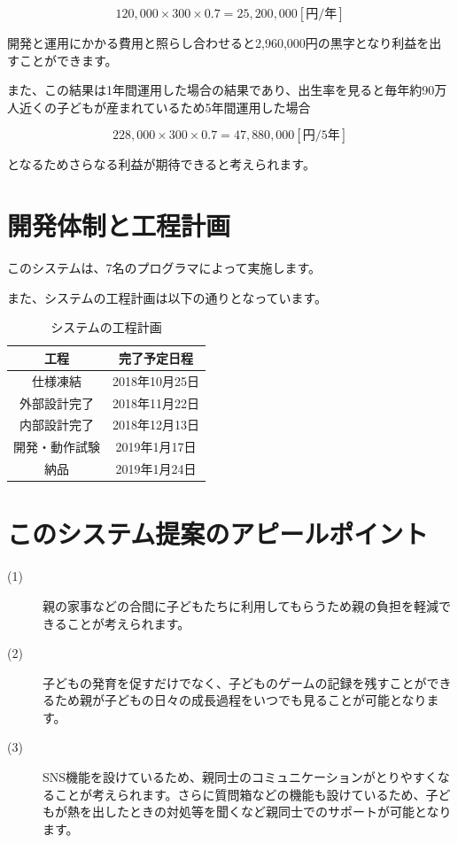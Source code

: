 \documentclass[a4j]{jarticle}
\begin{document}
\begin{equation}
  120,000×300×0.7 = 25,200,000 [円/年]
\end{equation}

開発と運用にかかる費用と照らし合わせると2,960,000円の黒字となり利益を出すことができます。\par
また、この結果は1年間運用した場合の結果であり、出生率を見ると毎年約90万人近くの子どもが産まれているため5年間運用した場合

\begin{equation}
  228,000×300×0.7 = 47,880,000　[円/5年]
\end{equation}

となるためさらなる利益が期待できると考えられます。



\section{開発体制と工程計画}
このシステムは、7名のプログラマによって実施します。\par
また、システムの工程計画は以下の通りとなっています。

\begin{table}[!h]
  \centering
  \caption{システムの工程計画}
  \begin{tabular}{|c|c|}
    \hline
    \multicolumn{1}{|c|}{工程} & \multicolumn{1}{c|}{完了予定日程} \\ \hline \hline
    仕様凍結 & 2018年10月25日  \\ \hline
    外部設計完了 & 2018年11月22日  \\ \hline
    内部設計完了 & 2018年12月13日 \\ \hline
    開発・動作試験 & 2019年1月17日  \\ \hline
    納品 & 2019年1月24日  \\ \hline
  \end{tabular}
\end{table}


\section{このシステム提案のアピールポイント}
\begin{description}
\item[(1)]親の家事などの合間に子どもたちに利用してもらうため親の負担を軽減できることが考えられます。
\item[(2)]子どもの発育を促すだけでなく、子どものゲームの記録を残すことができるため親が子どもの日々の成長過程をいつでも見ることが可能となります。
\item[(3)]SNS機能を設けているため、親同士のコミュニケーションがとりやすくなることが考えられます。さらに質問箱などの機能も設けているため、子どもが熱を出したときの対処等を聞くなど親同士でのサポートが可能となります。
\end{description}
\end{document}
